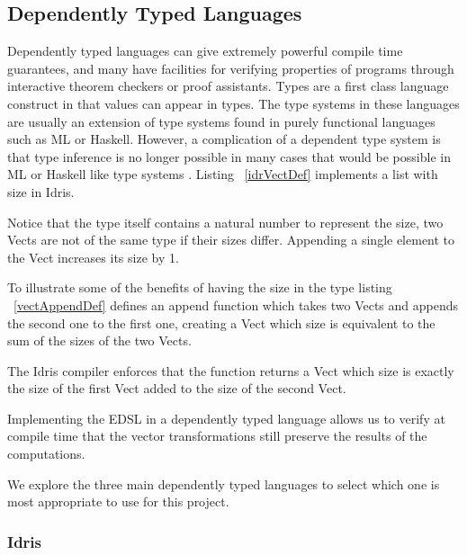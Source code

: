 \subsection{Dependently Typed Languages}

Dependently typed languages can give extremely powerful compile time guarantees, and many have facilities for
verifying properties of programs through interactive theorem checkers or proof assistants. Types are a first class language 
construct in that values can appear in types. The type systems
in these languages are usually an extension of type systems found in purely functional languages such as ML or Haskell.
However, a complication of a dependent type system is that type inference is no longer possible in
many cases that would be possible in ML or Haskell like type systems \cite{practicalDependent}.
Listing ~\ref{idrVectDef} implements a list with size in Idris. 


Notice that the type itself contains a natural number to represent the size, 
two Vects are not of the same type if their sizes differ. Appending a single element to the Vect increases
its size by 1.

To illustrate some of the benefits of having the size in the type listing ~\ref{vectAppendDef} defines an append function 
which takes two Vects and appends the second one to the first one, 
creating a Vect which size is equivalent to the sum of the sizes of the two Vects.


The Idris compiler enforces that the function returns a Vect which size is exactly the size of the first Vect 
added to the size of the second Vect.

Implementing the EDSL in a dependently typed language allows us to verify at compile time that the vector
transformations still preserve the results of the computations.

We explore the three main dependently typed languages to select which one is most appropriate to
use for this project.

\subsubsection{Idris}

